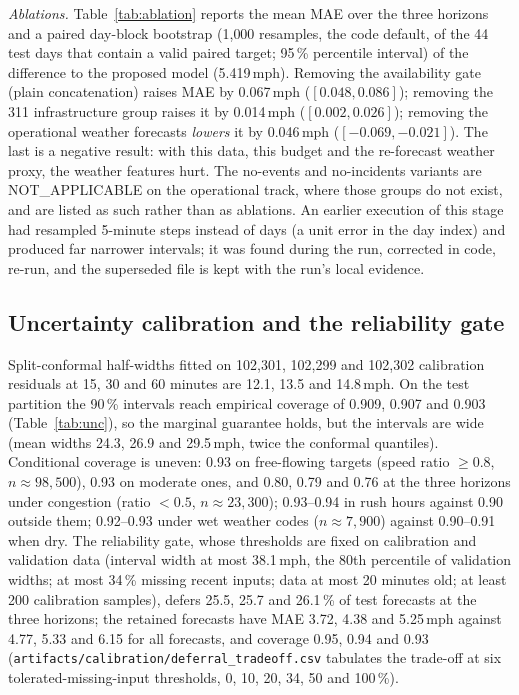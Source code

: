 \textit{Ablations.} Table~\ref{tab:ablation} reports the mean MAE over the three horizons and a paired day-block
bootstrap (1{,}000 resamples, the code default, of the 44 test days that contain a valid paired target; 95\,\%
percentile interval) of the difference to the
proposed model (5.419\,mph). Removing the availability gate (plain concatenation) raises MAE by 0.067\,mph
($[0.048, 0.086]$); removing the 311 infrastructure group raises it by 0.014\,mph ($[0.002, 0.026]$); removing the
operational weather forecasts \emph{lowers} it by 0.046\,mph ($[-0.069, -0.021]$). The last is a negative result:
with this data, this budget and the re-forecast weather proxy, the weather features hurt. The no-events and
no-incidents variants are NOT\_APPLICABLE on the operational track, where those groups do not exist, and are listed
as such rather than as ablations. An earlier execution of this stage had resampled 5-minute steps instead of days
(a unit error in the day index) and produced far narrower intervals; it was found during the run, corrected in code,
re-run, and the superseded file is kept with the run's local evidence.

\subsection{Uncertainty calibration and the reliability gate}
Split-conformal half-widths fitted on 102{,}301, 102{,}299 and 102{,}302 calibration residuals at 15, 30 and 60
minutes are 12.1, 13.5 and 14.8\,mph.
On the test partition the 90\,\% intervals reach empirical coverage of 0.909, 0.907 and 0.903 (Table~\ref{tab:unc}),
so the marginal guarantee holds, but the intervals are wide (mean widths 24.3, 26.9 and 29.5\,mph, twice the conformal
quantiles). Conditional coverage is uneven: 0.93 on free-flowing targets (speed ratio
$\ge 0.8$, $n\approx 98{,}500$), 0.93 on moderate ones, and 0.80, 0.79 and 0.76 at the three horizons under
congestion (ratio $< 0.5$, $n\approx 23{,}300$); 0.93--0.94 in rush hours against 0.90 outside them; 0.92--0.93 under
wet weather codes ($n\approx 7{,}900$) against 0.90--0.91 when dry. The reliability gate, whose thresholds are fixed
on calibration and validation data (interval width at most 38.1\,mph, the 80th percentile of validation widths; at
most 34\,\% missing recent inputs; data at most 20 minutes old; at least 200 calibration samples), defers 25.5, 25.7
and 26.1\,\% of test forecasts at the three horizons; the retained forecasts have MAE 3.72, 4.38 and 5.25\,mph against
4.77, 5.33 and 6.15 for all forecasts, and coverage 0.95, 0.94 and 0.93 (\texttt{artifacts/calibration/deferral\_tradeoff.csv}
tabulates the trade-off at six tolerated-missing-input thresholds, 0, 10, 20, 34, 50 and 100\,\%).


